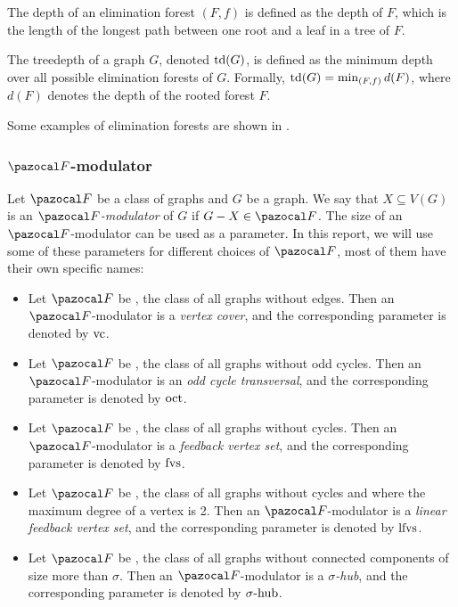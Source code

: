 \begin{definition}
    The depth of an elimination forest $(F, f)$ is defined as the depth of $F$, which is the length of the longest path between one root and a leaf in a tree of $F$.
\end{definition}

\begin{definition}[treedepth]
    The treedepth of a graph $G$, denoted $\text{td}(G)$, is defined as the minimum depth over all possible elimination forests of $G$. Formally, $\text{td}(G) = \min_{(F, f)} d(F)$, where $d(F)$ denotes the depth of the rooted forest $F$.
\end{definition}

Some examples of elimination forests are shown in .



\subsubsection*{$\F$-modulator}

Let $\F$ be a class of graphs and $G$ be a graph. We say that $X \subseteq V(G)$ is an \emph{$\F$-modulator} of $G$ if $G - X \in \F$. The size of an $\F$-modulator can be used as a parameter. In this report, we will use some of these parameters for different choices of $\F$, most of them have their own specific names:

\begin{itemize}
    \item Let $\F$ be , the class of all graphs without edges. Then an $\F$-modulator is a \textit{vertex cover}, and the corresponding parameter is denoted by $\text{vc}$.
    \item Let $\F$ be , the class of all graphs without odd cycles. Then an $\F$-modulator is an \textit{odd cycle transversal}, and the corresponding parameter is denoted by $\text{oct}$.
    \item Let $\F$ be , the class of all graphs without cycles. Then an $\F$-modulator is a \textit{feedback vertex set}, and the corresponding parameter is denoted by $\text{fvs}$.
    \item Let $\F$ be , the class of all graphs without cycles and where the maximum degree of a vertex is 2. Then an $\F$-modulator is a \textit{linear feedback vertex set}, and the corresponding parameter is denoted by $\text{lfvs}$.
    \item Let $\F$ be , the class of all graphs without connected components of size more than $\sigma$. Then an $\F$-modulator is a \textit{$\sigma$-hub}, and the corresponding parameter is denoted by $\sigma\text{-hub}$.
\end{itemize}

